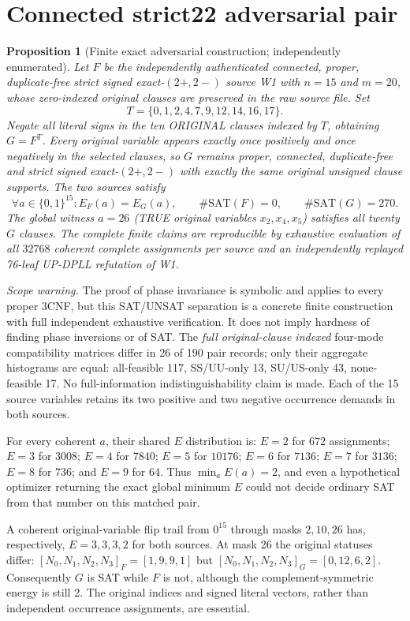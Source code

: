 \documentclass[10pt]{article}
\newtheorem{proposition}{Proposition}
\begin{document}
\section{Connected strict22 adversarial pair}
\begin{proposition}[Finite exact adversarial construction; independently enumerated]
Let $F$ be the independently authenticated connected, proper, duplicate-free strict signed exact-$(2+,2-)$ source W1 with $n=15$ and $m=20$, whose zero-indexed original clauses are preserved in the raw source file. Set
\[
T=\{0,1,2,4,7,9,12,14,16,17\}.
\]
Negate all literal signs in the ten ORIGINAL clauses indexed by $T$, obtaining $G=F^T$. Every original variable appears exactly once positively and once negatively in the selected clauses, so $G$ remains proper, connected, duplicate-free and strict signed exact-$(2+,2-)$ with exactly the same original unsigned clause supports. The two sources satisfy
\[
 \forall a\in\{0,1\}^{15}:E_F(a)=E_G(a),
 \qquad \#\mathrm{SAT}(F)=0,\qquad \#\mathrm{SAT}(G)=270.
\]
The global witness $a=26$ (TRUE original variables $x_2,x_4,x_5$) satisfies all twenty $G$ clauses. The complete finite claims are reproducible by exhaustive evaluation of all $32768$ coherent complete assignments per source and an independently replayed 76-leaf UP-DPLL refutation of W1.
\end{proposition}
\noindent\emph{Scope warning.} The proof of phase invariance is symbolic and applies to every proper 3CNF, but this SAT/UNSAT separation is a concrete finite construction with full independent exhaustive verification. It does not imply hardness of finding phase inversions or of SAT. The \emph{full original-clause indexed} four-mode compatibility matrices differ in 26 of 190 pair records; only their aggregate histograms are equal: all-feasible 117, SS/UU-only 13, SU/US-only 43, none-feasible 17. No full-information indistinguishability claim is made. Each of the 15 source variables retains its two positive and two negative occurrence demands in both sources.

For every coherent $a$, their shared $E$ distribution is: $E=2$ for $672$ assignments; $E=3$ for $3008$; $E=4$ for $7840$; $E=5$ for $10176$; $E=6$ for $7136$; $E=7$ for $3136$; $E=8$ for $736$; and $E=9$ for $64$. Thus $\min_aE(a)=2$, and even a hypothetical optimizer returning the exact global minimum $E$ could not decide ordinary SAT from that number on this matched pair.

A coherent original-variable flip trail from $0^{15}$ through masks $2,10,26$ has, respectively, $E=3,3,3,2$ for both sources. At mask 26 the original statuses differ: $[N_0,N_1,N_2,N_3]_F=[1,9,9,1]$ but $[N_0,N_1,N_2,N_3]_G=[0,12,6,2]$. Consequently $G$ is SAT while $F$ is not, although the complement-symmetric energy is still 2. The original indices and signed literal vectors, rather than independent occurrence assignments, are essential.
\end{document}
